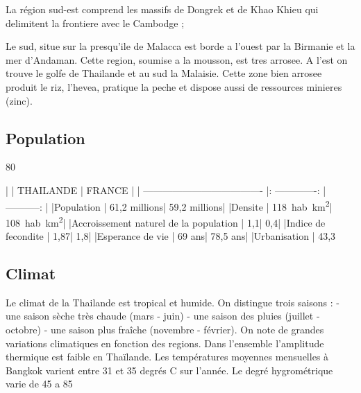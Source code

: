 \begin{multicols}{2}
La région sud-est comprend les massifs de Dongrek et de Khao Khieu qui delimitent la frontiere avec le Cambodge ;

Le sud, situe sur la presqu’ile de Malacca est borde a l’ouest par la Birmanie et la mer d’Andaman. Cette region, soumise a la mousson, est tres arrosee. A l’est on trouve le golfe de Thailande et au sud la Malaisie. Cette zone bien arrosee produit le riz, l’hevea, pratique la peche et dispose aussi de ressources minieres (zinc).


\subsection{Population}

80%

|                                       |     THAILANDE   |    FRANCE    |
| ------------------------------------- |: -------------: | -----------: |
|Population                             |    61,2 millions| 59,2 millions|
|Densite                                |      \SI{118}{hab.km^2}|   \SI{108}{hab.km^2}|
|Accroissement naturel de la population |              1,1|           0,4|
|Indice de fecondite                    |             1,87|           1,8|
|Esperance de vie                       |           69 ans|      78,5 ans|
|Urbanisation                           |           43,3 %

\subsection{Climat}

Le climat de la Thailande est tropical et humide. On distingue trois saisons :
- une saison sèche très chaude (mars - juin)
- une saison des pluies (juillet - octobre)
- une saison plus fraîche (novembre - février).
On note de grandes variations climatiques en fonction des regions. Dans l’ensemble l’amplitude thermique est faible en Thaïlande. Les températures moyennes mensuelles à Bangkok varient entre 31 et 35 degrés C sur l’année. Le degré hygrométrique varie de 45 a 85%



\end{multicols}
